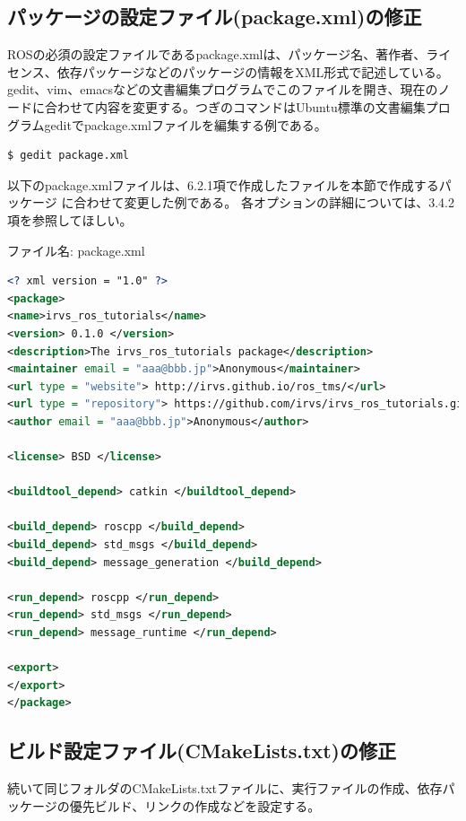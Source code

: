 \subsection{パッケージの設定ファイル(package.xml)の修正}

ROSの必須の設定ファイルであるpackage.xmlは、パッケージ名、著作者、ライセンス、依存パッケージなどのパッケージの情報をXML形式で記述している。gedit、vim、emacsなどの文書編集プログラムでこのファイルを開き、現在のノードに合わせて内容を変更する。つぎのコマンドはUbuntu標準の文書編集プログラムgeditでpackage.xmlファイルを編集する例である。

\begin{lstlisting}[language=ROS]
$ gedit package.xml
\end{lstlisting}

以下のpackage.xmlファイルは、6.2.1項で作成したファイルを本節で作成するパッケージ  に合わせて変更した例である。  各オプションの詳細については、3.4.2項を参照してほしい。

ファイル名: package.xml
\begin{lstlisting}[language=XML]
<? xml version = "1.0" ?>
<package>
<name>irvs_ros_tutorials</name>
<version> 0.1.0 </version>
<description>The irvs_ros_tutorials package</description>
<maintainer email = "aaa@bbb.jp">Anonymous</maintainer>
<url type = "website"> http://irvs.github.io/ros_tms/</url>
<url type = "repository"> https://github.com/irvs/irvs_ros_tutorials.git </url>
<author email = "aaa@bbb.jp">Anonymous</author>

<license> BSD </license>

<buildtool_depend> catkin </buildtool_depend>

<build_depend> roscpp </build_depend>
<build_depend> std_msgs </build_depend>
<build_depend> message_generation </build_depend>

<run_depend> roscpp </run_depend>
<run_depend> std_msgs </run_depend>
<run_depend> message_runtime </run_depend>

<export>
</export>
</package>
\end{lstlisting}

\subsection{ビルド設定ファイル(CMakeLists.txt)の修正}

続いて同じフォルダのCMakeLists.txtファイルに、実行ファイルの作成、依存パッケージの優先ビルド、リンクの作成などを設定する。

